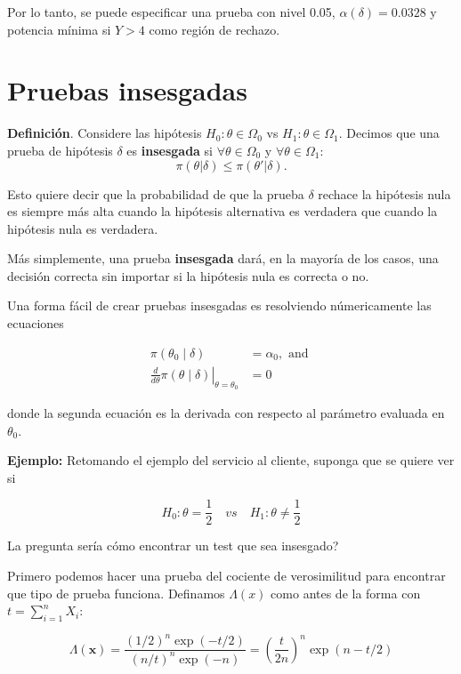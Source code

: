 \documentclass[
  12pt,
]{book}
\begin{document}
Por lo tanto, se puede especificar una prueba con nivel 0.05, \(\alpha(\delta) = 0.0328\) y potencia mínima si \(Y>4\) como región de rechazo.

\hypertarget{pruebas-insesgadas}{%
\section{Pruebas insesgadas}\label{pruebas-insesgadas}}

\textbf{Definición}. Considere las hipótesis \(H_0:\theta \in \Omega_0\) vs \(H_1: \theta\in \Omega_1\). Decimos que una prueba de hipótesis \(\delta\) es
\textbf{insesgada} si \(\forall \theta\in\Omega_0\) y \(\forall \theta\in \Omega_1\):
\[\pi(\theta|\delta) \leq \pi(\theta'|\delta).\]

Esto quiere decir que la probabilidad de que la prueba \(\delta\) rechace la
hipótesis nula es siempre más alta cuando la hipótesis alternativa es verdadera
que cuando la hipótesis nula es verdadera.

Más simplemente, una prueba \textbf{insesgada} dará, en la mayoría de los casos, una
decisión correcta sin importar si la hipótesis nula es correcta o no.

Una forma fácil de crear pruebas insesgadas es resolviendo númericamente las ecuaciones

\begin{align*}
\pi\left(\theta_{0} \mid \delta\right) &=\alpha_{0}, \text { and } \\
\left.\frac{d}{d \theta} \pi(\theta \mid \delta)\right|_{\theta=\theta_{0}} &=0
\end{align*}

donde la segunda ecuación es la derivada con respecto al parámetro evaluada en \(\theta_0\).

\textbf{Ejemplo:} Retomando el ejemplo del servicio al cliente, suponga que se
quiere ver si

\[
H_0: \theta = \frac{1}{2} \quad vs \quad H_1: \theta \neq \frac{1}{2}
\]

La pregunta sería cómo encontrar un test que sea insesgado?

Primero podemos hacer una prueba del cociente de verosimilitud para encontrar
que tipo de prueba funciona. Definamos \(\Lambda (x)\) como antes de la forma
con \(t = \sum_{i=1}^{n} X_i\):

\[
\Lambda(\boldsymbol{x})=\frac{(1 / 2)^{n} \exp (-t / 2)}{(n / t)^{n} \exp (-n)}=\left(\frac{t}{2 n}\right)^{n} \exp (n-t / 2)
\]
\end{document}
